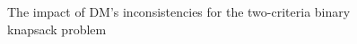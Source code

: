 \begin{figure}
  \centering
  \caption{The impact of DM's inconsistencies for the two-criteria binary knapsack problem}
  \label{c2_noise}
\end{figure}

